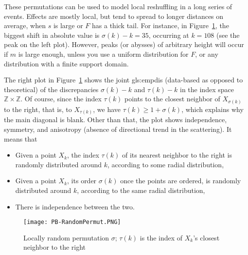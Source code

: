 \documentclass[10pt]{article}
\begin{document}
These permutations can be used to model local reshuffling in a long series of events. Effects are mostly local, but tend to
spread to longer distances on average, when $s$ is large or $F$ has a thick tail. For instance, in Figure~\ref{fig:pbpermut}, the biggest shift in absolute value is $\sigma(k)-k =35$, occurring at $k=108$ (see the peak on the left plot). However, peaks (or abysses) of arbitrary height will occur if $m$ is large enough, unless you use a uniform distribution for $F$, or any distribution with a finite support domain.

The right plot in Figure~\ref{fig:pbpermut} shows the  joint \gls{gls:empdis} (data-based as opposed to theoretical) of the discrepancies  $\sigma(k) - k$ and $\tau(k)-k$ in the index space $\mathbb{Z}\times\mathbb{Z}$. Of course, since the index $\tau(k)$ points to the closest neighbor of  $X_{\sigma(k)}$ to the right, that is, to $X_{\tau(k)}$, we have $\tau(k)\geq 1+\sigma(k)$, which explains why the main diagonal is blank. Other than that, the plot shows independence, symmetry, and 
\textcolor{index}{anisotropy} (absence of directional trend in the scattering). It means that 
\begin{itemize}
\item Given a point $X_k$, the index $\tau(k)$ of its nearest neighbor to the right is randomly distributed around $k$, according to some radial distribution,
\item Given a point $X_k$, its order $\sigma(k)$ once the points are ordered,  is randomly distributed around $k$, according to the same radial distribution,
\item There is independence between the two.  
\end{itemize}


\begin{figure}%
\centering
\texttt{[image: PB-RandomPermut.PNG]}
\caption{Locally random permutation $\sigma$; $\tau(k)$ is the index of $X_k$'s closest neighbor to the right}
\label{fig:pbpermut}
\end{figure}
\end{document}
